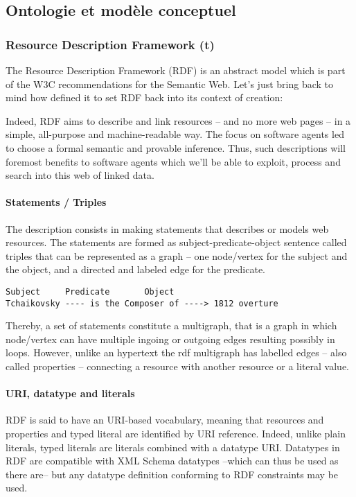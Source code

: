 \subsection{Ontologie et modèle conceptuel}\label{sec:onto-mc}
\subsubsection{Resource Description Framework (t)}
The Resource  Description Framework (RDF) is an abstract model which is part of the W3C recommendations for the Semantic Web. 
Let's just bring back to mind how  defined it to set RDF back into its context of creation: 


Indeed, RDF aims to describe and link resources – and no more web pages – in a simple, all-purpose and machine-readable way. 
The focus on software agents led to choose a formal semantic and provable inference. 
Thus, such descriptions will foremost benefits to software agents which we'll be able to exploit, process and search into this web of linked data. 

\paragraph{Statements / Triples}
The description consists in making statements that describes or models web resources. The statements are formed as subject-predicate-object sentence called triples that can be represented as a graph – one node/vertex for the subject and the object, and a directed and labeled edge for the predicate. 
\begin{Verbatim}[fontsize=\small,formatcom=\color{black!70}]
Subject		Predicate	    Object	
Tchaikovsky ---- is the Composer of ----> 1812 overture
\end{Verbatim}
Thereby, a set of statements constitute a multigraph, that is a graph in which node/vertex can have multiple ingoing or outgoing edges resulting possibly in loops. 
However, unlike an hypertext the rdf multigraph has labelled edges – also called properties -- connecting a resource with another resource or a literal value.

\paragraph{URI, datatype and literals}
RDF is said to have an URI-based vocabulary, meaning that resources and properties and typed literal are identified by URI reference. 
Indeed, unlike plain literals, typed literals are literals combined with a datatype URI.
Datatypes in RDF are compatible with XML Schema datatypes --which can thus be used as there are-- but any datatype definition conforming to RDF constraints may be used.

